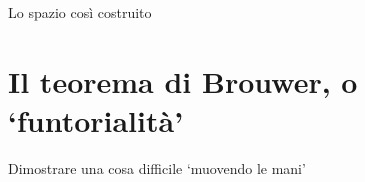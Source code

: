 Lo spazio così costruito
\section*{Il teorema di Brouwer, o `funtorialità'}
Dimostrare una cosa difficile `muovendo le mani'

